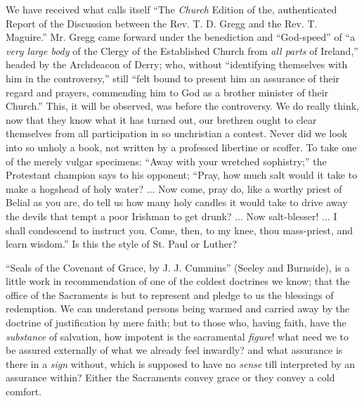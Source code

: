 We have received what calls itself ``The \emph{Church}
Edition of the, authenticated Report of the Discussion between the Rev.
T. D. Gregg and the Rev. T. Maguire.'' Mr. Gregg came forward under the
benediction and ``God-speed'' of ``a \emph{very large body} of the Clergy
of the Established Church from \emph{all parts} of Ireland,'' headed by
the Archdeacon of Derry; who, without ``identifying themselves with him
in the controversy,'' still ``felt bound to present him an assurance of
their regard and prayers, commending him to God as a brother minister of
their Church.'' This, it will be observed, was before the controversy. We
do really think, now that they know what it has turned out, our brethren
ought to clear themselves from all participation in so unchristian a
contest. Never did we look into so unholy a book, not written by a
professed libertine or scoffer. To take one of the merely vulgar
specimens: ``Away with your wretched sophistry;'' the Protestant champion
says to his opponent; ``Pray, how much salt would it take to make a
hogshead of holy water? ... Now come, pray do, like a worthy priest of
Belial as you are, do tell us how many holy candles it would take to
drive away the devils that tempt a poor Irishman to get drunk? ... Now
salt-blesser! ... I shall condescend to instruct you. Come, then, to my
knee, thou mass-priest, and learn wisdom.'' Is this the style of St. Paul
or Luther?

``Seals of the Covenant of Grace, by J. J. Cummins''
(Seeley and Burnside), is a little work in recommendation of one of the
coldest doctrines we know; that the office of the Sacraments is but to
represent and pledge to us the blessings of redemption. We can
understand persons being warmed and carried away by the doctrine of
justification by mere faith; but to those who, having faith, have the \emph{substance}
of salvation, how impotent is the sacramental \emph{figure}! what
need we to be assured externally of what we already feel inwardly? and
what assurance is there in a \emph{sign} without, which is supposed to
have no \emph{sense} till interpreted by an assurance within? Either the
Sacraments convey grace or they convey a cold comfort.

